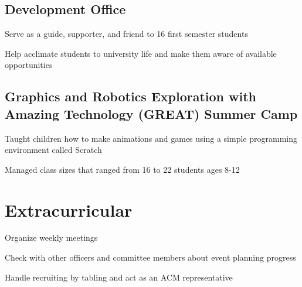 \documentclass[letterpaper]{outline} %
\begin{document}
\begin{minipage}[t]{0.64\textwidth}
\subsection{Development Office}

\begin{tightitemize}
\item Serve as a guide, supporter, and friend to 16 first semester students
\item Help acclimate students to university life and make them aware of available opportunities
\sectionspace

\end{tightitemize}


\subsection{Graphics and Robotics Exploration with Amazing Technology (GREAT) Summer Camp }

\begin{tightitemize}
\item Taught children how to make animations and games using a simple programming environment called Scratch
\item Managed class sizes that ranged from 16 to 22 students ages 8-12 

\end{tightitemize}

\sectionspace %


\section{Extracurricular}

\begin{tightitemize}
\item Organize weekly meetings
\item Check with other officers and committee members about event planning progress
\item Handle recruiting by tabling and act as an ACM representative


\end{tightitemize}
\end{minipage}
\end{document}

